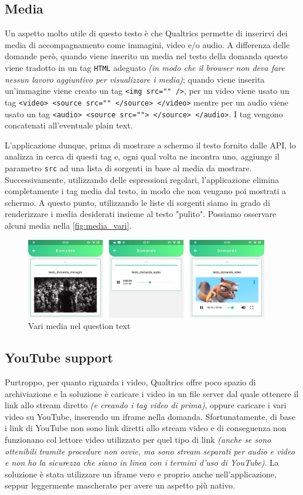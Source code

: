 \subsection{Media}
Un aspetto molto utile di questo testo è che Qualtrics permette di inserirvi dei media di accompagnamento come immagini, video e/o audio. A differenza delle domande però, quando viene inserito un media nel testo della domanda questo viene tradotto in un tag \texttt{HTML} adeguato \textit{(in modo che il browser non deva fare nessun lavoro aggiuntivo per visualizzare i media)}; quando viene inserita un'immagine viene creato un tag \texttt{<img src="" />}, per un video viene usato un tag \texttt{<video> <source src="" </source> </video>} mentre per un audio viene usato un tag \texttt{<audio> <source src=""> </source> </audio>}. I tag vengono concatenati all'eventuale plain text.

L'applicazione dunque, prima di mostrare a schermo il testo fornito dalle API, lo analizza in cerca di questi tag e, ogni qual volta ne incontra uno, aggiunge il parametro \texttt{src} ad una lista di sorgenti in base al media da mostrare. Successivamente, utilizzando delle espressioni regolari, l'applicazione elimina completamente i tag media dal testo, in modo che non vengano poi mostrati a schermo. A questo punto, utilizzando le liste di sorgenti siamo in grado di renderizzare i media desiderati insieme al testo "pulito". Possiamo osservare alcuni media nella \autoref{fig:media_vari}.

\begin{figure}[h!]
\centering
\includegraphics[width=0.95\textwidth]{img/media_vari}
\caption{Vari media nel question text}
\label{fig:media_vari}
\end{figure}

\subsection{YouTube support}
Purtroppo, per quanto riguarda i video, Qualtrics offre poco spazio di archiviazione e la soluzione è caricare i video in un file server dal quale ottenere il link allo stream diretto \textit{(e creando i tag video di prima)}, oppure caricare i vari video su YouTube, inserendo un iframe nella domanda. Sfortunatamente, di base i link di YouTube non sono link diretti allo stream video e di conseguenza non funzionano col lettore video utilizzato per quel tipo di link \textit{(anche se sono ottenibili tramite procedure non ovvie, ma sono stream separati per audio e video e non ho la sicurezza che siano in linea con i termini d'uso di YouTube)}. La soluzione è stata utilizzare un iframe vero e proprio anche nell'applicazione, seppur leggermente mascherato per avere un aspetto più nativo.

